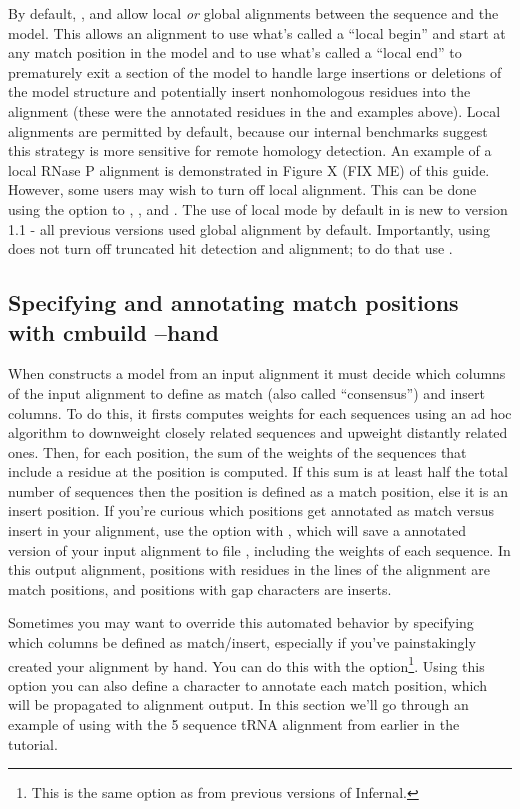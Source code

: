 By default, ,  and  allow
local \emph{or} global alignments between the sequence and the
model. This allows an alignment to use what's called a ``local begin''
and start at any match position in the model and to use what's called
a ``local end'' to prematurely exit a section of the model to handle
large insertions or deletions of the model structure and potentially
insert nonhomologous residues into the alignment (these were the
\otext{~} annotated residues in the  and 
examples above). Local alignments are permitted by default, because
our internal benchmarks suggest this strategy is more sensitive for
remote homology detection. An example of a local RNase P alignment is
demonstrated in Figure X (FIX ME) of this guide. However, some users
may wish to turn off local alignment. This can be done using the
 option to , , and
. The use of local mode by default in  is
new to version 1.1 - all previous versions used global alignment by
default. Importantly, using  does not turn off
truncated hit detection and alignment; to do that use
. 

\subsection{Specifying and annotating match positions with cmbuild --hand}

When  constructs a model from an input alignment it must
decide which columns of the input alignment to define as match (also
called ``consensus'') and insert columns. To do this, it firsts
computes weights for each sequences using an ad hoc algorithm to
downweight closely related sequences and upweight distantly related
ones. Then, for each position, the sum of the weights of
the sequences that include a residue at the position is computed. If
this sum is at least half the total number of sequences then the
position is defined as a match position, else it is an insert
position. If you're curious which positions get annotated as match
versus insert in your alignment, use the  option with
, which will save a annotated version of your input
alignment to file , including the weights of each
sequence. In this output alignment, positions with residues in the
 lines of the alignment are match positions, and
positions with gap characters are inserts.

Sometimes you may want to override this automated behavior by
specifying which columns be defined as match/insert, especially if
you've painstakingly created your alignment by hand. You can do this
with the  option\footnote{This is the same option as
   from previous versions of Infernal.}. Using this option
you can also define a character to annotate each match position, which
will be propagated to alignment output. In this section we'll go
through an example of using  with the 5 sequence tRNA
alignment from earlier in the tutorial.


